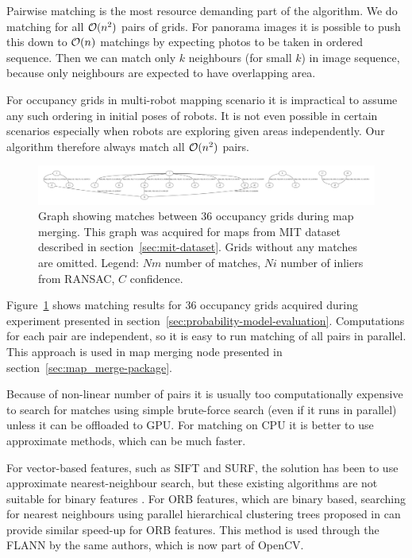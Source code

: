 Pairwise matching is the most resource demanding part of the algorithm. We do matching for all $\operatorname{\mathcal{O}}(n^2)$ pairs of grids. For panorama images it is possible to push this down to $\operatorname{\mathcal{O}}(n)$ matchings by expecting photos to be taken in ordered sequence. Then we can match only $k$ neighbours (for small $k$) in image sequence, because only neighbours are expected to have overlapping area.

For occupancy grids in multi-robot mapping scenario it is impractical to assume any such ordering in initial poses of robots. It is not even possible in certain scenarios especially when robots are exploring given areas independently. Our algorithm therefore always match all $\operatorname{\mathcal{O}}(n^2)$ pairs.

\begin{figure}
    \centering
    \includegraphics[width=\textwidth]{../img/matches.pdf}
    \caption[Matches between occupancy grids during map merging.]{Graph showing matches between $36$ occupancy grids during map merging. This graph was acquired for maps from MIT dataset described in section~\ref{sec:mit-dataset}. Grids without any matches are omitted. Legend: $Nm$ number of matches, $Ni$ number of inliers from \gls{RANSAC}, $C$ confidence.}
    \label{fig:matches}
\end{figure}

Figure~\ref{fig:matches} shows matching results for $36$ occupancy grids acquired during experiment presented in section~\ref{sec:probability-model-evaluation}. Computations for each pair are independent, so it is easy to run matching of all pairs in parallel. This approach is used in map merging node presented in section~\ref{sec:map_merge-package}.

Because of non-linear number of pairs it is usually too computationally expensive to search for matches using simple brute-force search (even if it runs in parallel) unless it can be offloaded to GPU. For matching on CPU it is better to use approximate methods, which can be much faster.

For vector-based features, such as \gls{SIFT} and \gls{SURF}, the solution has been to use approximate nearest-neighbour search, but these existing algorithms are not suitable for binary features \cite{Muja2012}. For \gls{ORB} features, which are binary based, searching for nearest neighbours using parallel hierarchical clustering trees proposed in \cite{Muja2012} can provide similar speed-up for \gls{ORB} features. This method is used through the \gls{FLANN} by the same authors, which is now part of \gls{OpenCV}.

